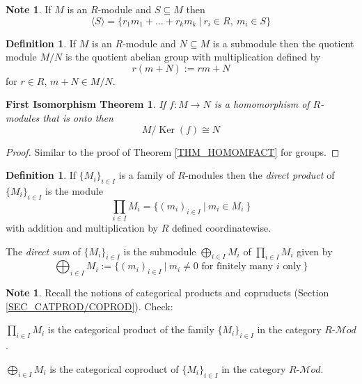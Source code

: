 \documentclass[12pt, letterpaper, oneside]{article}
\theoremstyle{plain}
\newtheorem{FIT}[theorem]{First Isomorphism Theorem}
\theoremstyle{definition}
\newtheorem{definition}[theorem]{Definition}
\newtheorem{note}[theorem]{Note}
\newcommand{\Ker}{\operatorname{Ker}}
\newcommand{\subgp}[1]{\langle#1\rangle}
\newcommand{\Mod}{{\mathcal Mod}}
\newcommand{\vs}{\vskip 5mm}
\begin{document}
\vs\vs

\begin{note}
If $M$ is an $R$-module and  $S\subseteq M$ then 
$$\subgp{S} = \{r_{1}m_{1} + {\dots} + r_{k}m_{k} \ | \ r_{i}\in R, \ m_{i}\in S \}$$
\end{note}

\vs\vs

\begin{definition}
If $M$ is an $R$-module and $N\subseteq M$ is a submodule then the quotient module 
$M/N$ is the quotient abelian group with multiplication defined by 
$$r(m+N) := rm + N$$
for $r\in R$, $m+ N \in M/N$. 
\end{definition}

\vs\vs

\begin{FIT}
\label{THM_FITMODULES}
If $f\colon M\to N$ is a homomorphism of $R$-modules that is onto then 
$$M/\Ker(f) \cong N$$
\end{FIT}

\vs


\begin{proof}
Similar to the proof of Theorem  \ref{THM_HOMOMFACT} for groups. 
\end{proof}



\vs\vs

\begin{definition}
If $\{M_{i}\}_{i\in I}$ is a family of $R$-modules then the \emph{direct product} of $\{M_{i}\}_{i\in I}$
is the module 
$$\prod_{i\in I}M_{i} = \{(m_{i})_{i\in I} \ | \ m_{i}\in M_{i} \ \}$$
with addition and multiplication by $R$ defined coordinatewise. 

The \emph{direct sum} of $\{M_{i}\}_{i\in I}$ is the submodule 
$\bigoplus_{i\in I} M_{i}$ of $\prod_{i\in I}M_{i}$ given by 
$$\bigoplus_{i\in I}M_{i} := \{(m_{i})_{i\in I} \ | \  m_{i}\neq 0 \text{ for finitely many $i$ only}\ \}$$

\vs\vs

\begin{note} Recall the notions of categorical products and copruducts 
(Section \ref{SEC_CATPROD/COPROD}). Check:

$\prod_{i\in I}M_{i}$ is the categorical product of the family $\{M_{i}\}_{i\in I}$ in the category 
$R$-$\Mod$. 

$\bigoplus_{i\in I}M_{i}$ is the categorical coproduct of $\{M_{i}\}_{i\in I}$ in the category 
$R$-$\Mod$. 

\end{note}

\end{definition} 
 
\end{document}

